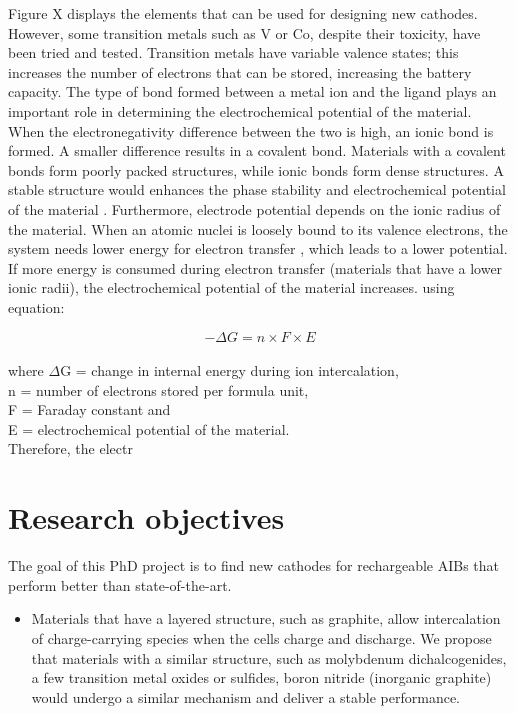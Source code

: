 {Figure X displays the elements that can be used for designing new cathodes. However, some transition metals such as V or Co, despite their toxicity, have been tried and tested. Transition metals have variable valence states; this increases the number of electrons that can be stored, increasing the battery capacity. The type of bond formed between a metal ion and the ligand plays an important role in determining the electrochemical potential of the material. When the electronegativity difference between the two is high, an ionic bond is formed. A smaller difference results in a covalent bond. Materials with a covalent bonds form poorly packed structures, while ionic bonds form dense structures. A stable structure would enhances the phase stability and electrochemical potential of the material \cite{melot}. Furthermore, electrode potential depends on the ionic radius of the material. When an atomic nuclei is loosely bound to its valence electrons, the system needs lower energy for electron transfer , which leads to a lower potential. If more energy is consumed during electron transfer (materials that have a lower ionic radii), the electrochemical potential of the material increases. using equation:

\begin{equation} \label{eq4}
    -\Delta G = n \times F \times E
\end{equation}\\
where $\Delta$G = change in internal energy during ion intercalation,\\
n = number of electrons stored per formula unit,\\
F = Faraday constant and\\
E = electrochemical potential of the material.\\

Therefore, the electr
\section{Research objectives}

The goal of this PhD project is to find new cathodes for rechargeable AIBs that perform better than state-of-the-art. 
\begin{itemize}
    \item Materials that have a layered structure, such as graphite, allow intercalation of charge-carrying species when the cells charge and discharge. We propose that materials with a similar structure, such as molybdenum dichalcogenides, a few transition metal oxides or sulfides, boron nitride (inorganic graphite) would undergo a similar mechanism and deliver a stable performance. 
    

\end{itemize}}
